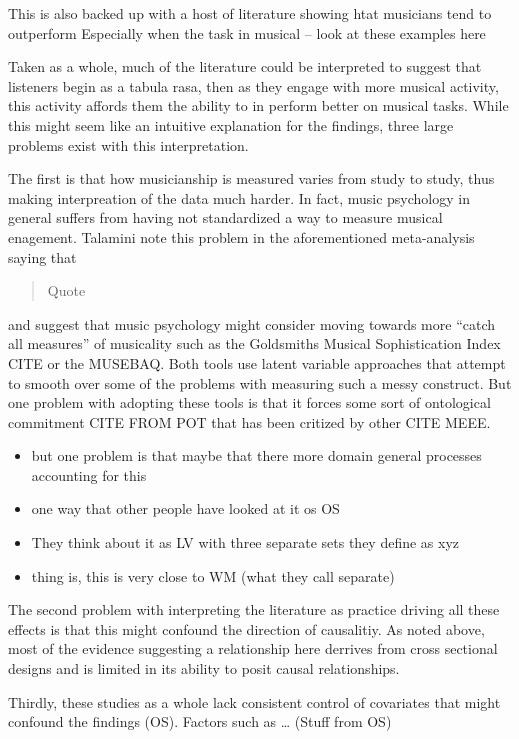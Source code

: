 \documentclass[]{book}
\providecommand{\tightlist}{%
  \setlength{\itemsep}{0pt}\setlength{\parskip}{0pt}}
\begin{document}
This is also backed up with a host of literature showing htat musicians tend to outperform
Especially when the task in musical
-- look at these examples here

Taken as a whole, much of the literature could be interpreted to suggest that listeners begin as a tabula rasa, then as they engage with more musical activity, this activity affords them the ability to in perform better on musical tasks.
While this might seem like an intuitive explanation for the findings, three large problems exist with this interpretation.

The first is that how musicianship is measured varies from study to study, thus making interpreation of the data much harder.
In fact, music psychology in general suffers from having not standardized a way to measure musical enagement.
Talamini note this problem in the aforementioned meta-analysis saying that

\begin{quote}
Quote
\end{quote}

and suggest that music psychology might consider moving towards more ``catch all measures'' of musicality such as the Goldsmiths Musical Sophistication Index CITE or the MUSEBAQ.
Both tools use latent variable approaches that attempt to smooth over some of the problems with measuring such a messy construct.
But one problem with adopting these tools is that it forces some sort of ontological commitment CITE FROM POT that has been critized by other CITE MEEE.

\begin{itemize}
\tightlist
\item
  but one problem is that maybe that there more domain general processes accounting for this
\item
  one way that other people have looked at it os OS
\item
  They think about it as LV with three separate sets they define as xyz
\item
  thing is, this is very close to WM (what they call separate)
\end{itemize}

The second problem with interpreting the literature as practice driving all these effects is that this might confound the direction of causalitiy.
As noted above, most of the evidence suggesting a relationship here derrives from cross sectional designs and is limited in its ability to posit causal relationships.

Thirdly, these studies as a whole lack consistent control of covariates that might confound the findings (OS).
Factors such as \ldots{} (Stuff from OS)
\end{document}
